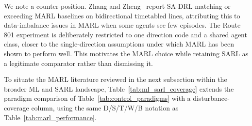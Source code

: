 We note a counter-position. Zhang and Zheng~\cite{Zhang2025SADRL} report SA-DRL matching or exceeding MARL baselines on bidirectional timetabled lines, attributing this to data-imbalance issues in MARL when some agents see few episodes. The Route 801 experiment is deliberately restricted to one direction code and a shared agent class, closer to the single-direction assumptions under which MARL has been shown to perform well. This motivates the MARL choice while retaining SARL as a legitimate comparator rather than dismissing it.

To situate the MARL literature reviewed in the next subsection within the broader ML and SARL landscape, Table~\ref{tab:ml_sarl_coverage} extends the paradigm comparison of Table~\ref{tab:control_paradigms} with a disturbance-coverage column, using the same D/S/T/W/B notation as Table~\ref{tab:marl_performance}.

